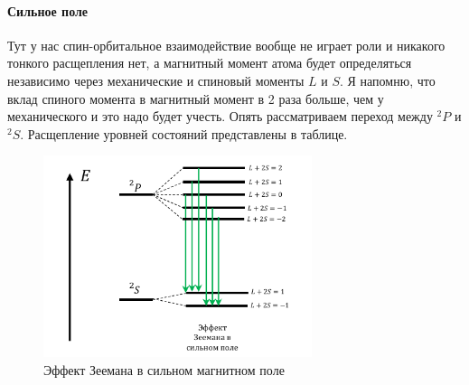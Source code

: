 \documentclass[12pt]{article}
\begin{document}
\paragraph{Сильное поле} Тут у нас спин-орбитальное взаимодействие вообще не играет роли и никакого тонкого расщепления нет, а магнитный момент атома будет определяться независимо через механические и спиновый моменты $L$ и $S$. Я напомню, что вклад спиного момента в магнитный момент в 2 раза больше, чем у механического и это надо будет учесть. Опять рассматриваем переход между $^2P$ и $^2S$. Расщепление уровней состояний представлены в таблице.


\begin{figure}[h]
    \centering
    \includegraphics[width=0.7\textwidth,height=\textheight,keepaspectratio]{Seminar_08/pics/pic_04.pdf}
    \caption{Эффект Зеемана в сильном магнитном поле}
    \label{fig:sem_08_strong_zeeman}
\end{figure}
\end{document}
